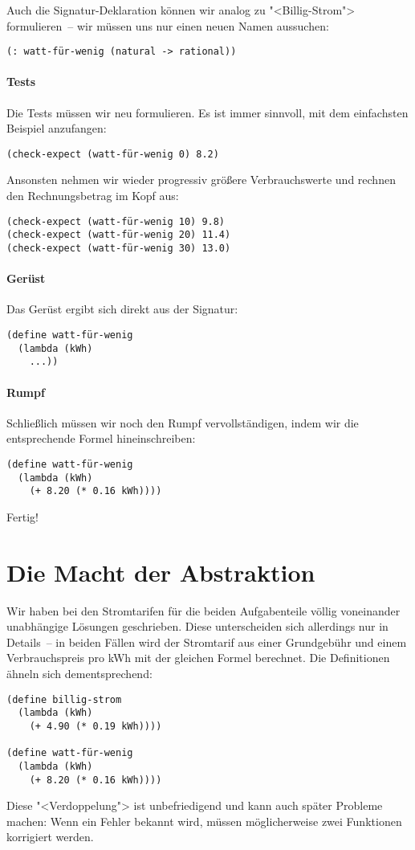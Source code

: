 Auch die Signatur-Deklaration können wir analog zu "<Billig-Strom">
formulieren~-- wir müssen uns nur einen neuen Namen aussuchen:
%
\begin{lstlisting}
(: watt-für-wenig (natural -> rational))
\end{lstlisting}

\paragraph{Tests}

Die Tests müssen wir neu formulieren.  Es ist immer sinnvoll, mit dem
einfachsten Beispiel anzufangen:
\begin{lstlisting}
(check-expect (watt-für-wenig 0) 8.2)
\end{lstlisting}

Ansonsten nehmen wir wieder progressiv größere Verbrauchswerte und
rechnen den Rechnungsbetrag im Kopf aus:
%
\begin{lstlisting}
(check-expect (watt-für-wenig 10) 9.8)
(check-expect (watt-für-wenig 20) 11.4)
(check-expect (watt-für-wenig 30) 13.0)
\end{lstlisting}

\paragraph{Gerüst}

Das Gerüst ergibt sich direkt aus der Signatur:
%
\begin{lstlisting}
(define watt-für-wenig
  (lambda (kWh)
    ...))
\end{lstlisting}

\paragraph{Rumpf}

Schließlich müssen wir noch den Rumpf vervollständigen, indem wir die
entsprechende Formel hineinschreiben:
%
\begin{lstlisting}
(define watt-für-wenig
  (lambda (kWh)
    (+ 8.20 (* 0.16 kWh))))
\end{lstlisting}
%
Fertig!

\section{Die Macht der Abstraktion}
\label{sec:abstraktion}

Wir haben bei den Stromtarifen für die beiden
Aufgabenteile völlig voneinander unabhängige Lösungen geschrieben.
Diese unterscheiden sich allerdings nur in Details~-- in beiden Fällen
wird der Stromtarif aus einer Grundgebühr und einem Verbrauchspreis
pro kWh mit der gleichen Formel berechnet.  Die Definitionen ähneln
sich dementsprechend:
%
\begin{lstlisting}
(define billig-strom
  (lambda (kWh)
    (+ 4.90 (* 0.19 kWh))))

(define watt-für-wenig
  (lambda (kWh)
    (+ 8.20 (* 0.16 kWh))))
\end{lstlisting}
%
Diese "<Verdoppelung"> ist unbefriedigend und kann auch später
Probleme machen: Wenn ein Fehler bekannt wird, müssen möglicherweise
zwei Funktionen korrigiert werden.


